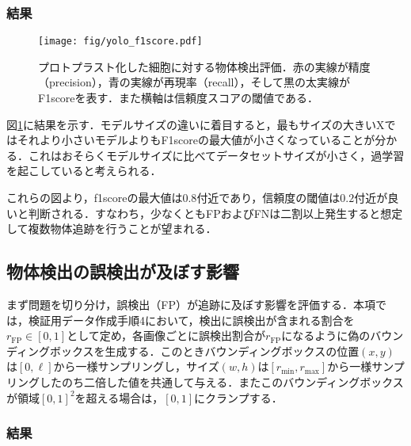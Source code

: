     \subsubsection{結果}

    \begin{figure}[t]
        \centering
        \texttt{[image: fig/yolo\_f1score.pdf]}
        \caption[プロトプラスト化した細胞に対する物体検出評価]{プロトプラスト化した細胞に対する物体検出評価．赤の実線が精度（precision），青の実線が再現率（recall），そして黒の太実線がF1scoreを表す．また横軸は信頼度スコアの閾値である．}
        \label{fig:yolo_f1score}
    \end{figure}

    図\ref{fig:yolo_f1score}に結果を示す．モデルサイズの違いに着目すると，最もサイズの大きいXではそれより小さいモデルよりもF1scoreの最大値が小さくなっていることが分かる．これはおそらくモデルサイズに比べてデータセットサイズが小さく，過学習を起こしていると考えられる．

    これらの図より，f1scoreの最大値は$0.8$付近であり，信頼度の閾値は$0.2$付近が良いと判断される．すなわち，少なくともFPおよびFNは二割以上発生すると想定して複数物体追跡を行うことが望まれる．

    \subsection{物体検出の誤検出が及ぼす影響}
    \label{subsec:FPeffect}

    まず問題を切り分け，誤検出（FP）が追跡に及ぼす影響を評価する．本項では，検証用データ作成手順4において，検出に誤検出が含まれる割合を$r_{\text{FP}} \in [0, 1]$として定め，各画像ごとに誤検出割合が$r_{\text{FP}}$になるように偽のバウンディングボックスを生成する．このときバウンディングボックスの位置$(x,y)$は$[0, \ell]$から一様サンプリングし，サイズ$(w, h)$は$[r_{\text{min}}, r_{\text{max}}]$から一様サンプリングしたのち二倍した値を共通して与える．またこのバウンディングボックスが領域$[0, 1]^2$を超える場合は，$[0, 1]$にクランプする．

        \subsubsection{結果}

